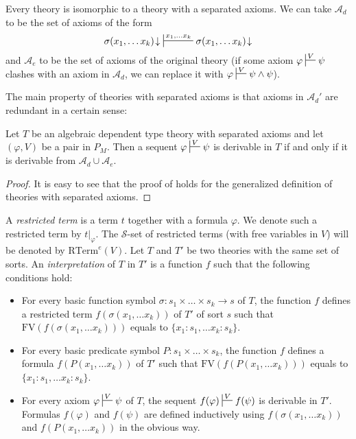 \documentclass[reqno]{amsart}
\theoremstyle{definition}
\theoremstyle{remark}
\newcommand{\fs}[1]{\mathrm{#1}}
\newcommand{\RTerm}{\fs{RTerm}}
\newcommand{\FV}{\fs{FV}}
\numberwithin{figure}{section}
\begin{document}
\begin{remark}
Every theory is isomorphic to a theory with a separated axioms.
We can take $\mathcal{A}_d$ to be the set of axioms of the form
\[ \sigma(x_1, \ldots x_k)\!\downarrow\ \sststile{}{x_1, \ldots x_k} \sigma(x_1, \ldots x_k)\!\downarrow \]
and $\mathcal{A}_e$ to be the set of axioms of the original theory (if some axiom $\varphi \sststile{}{V} \psi$ clashes with an axiom in $\mathcal{A}_d$, we can replace it with $\varphi \sststile{}{V} \psi \land \psi$).
\end{remark}

The main property of theories with separated axioms is that axioms in $\mathcal{A}_d'$ are redundant in a certain sense:

\begin{prop}
Let $T$ be an algebraic dependent type theory with separated axioms and let $(\varphi,V)$ be a pair in $P_M$.
Then a sequent $\varphi \sststile{}{V} \psi$ is derivable in $T$ if and only if it is derivable from $\mathcal{A}_d \cup \mathcal{A}_e$.
\end{prop}
\begin{proof}
It is easy to see that the proof of \cite[Proposition~5.3]{morita-equiv} holds for the generalized definition of theories with separated axioms.
\end{proof}

A \emph{restricted term} is a term $t$ together with a formula $\varphi$.
We denote such a restricted term by $t|_\varphi$.
The $\mathcal{S}$-set of restricted terms (with free variables in $V$) will be denoted by $\RTerm^e(V)$.
Let $T$ and $T'$ be two theories with the same set of sorts.
An \emph{interpretation} of $T$ in $T'$ is a function $f$ such that the following conditions hold:
\begin{itemize}
\item For every basic function symbol $\sigma : s_1 \times \ldots \times s_k \to s$ of $T$,
the function $f$ defines a restricted term $f(\sigma(x_1, \ldots x_k))$ of $T'$ of sort $s$ such that $\FV(f(\sigma(x_1, \ldots x_k)))$ equals to $\{ x_1 : s_1, \ldots x_k : s_k \}$.
\item For every basic predicate symbol $P : s_1 \times \ldots \times s_k$,
the function $f$ defines a formula $f(P(x_1, \ldots x_k))$ of $T'$ such that $\FV(f(P(x_1, \ldots x_k)))$ equals to $\{ x_1 : s_1, \ldots x_k : s_k \}$.
\item For every axiom $\varphi \sststile{}{V} \psi$ of $T$, the sequent $f(\varphi) \sststile{}{V} f(\psi)$ is derivable in $T'$.
Formulas $f(\varphi)$ and $f(\psi)$ are defined inductively using $f(\sigma(x_1, \ldots x_k))$ and $f(P(x_1, \ldots x_k))$ in the obvious way.
\end{itemize}
\end{document}
